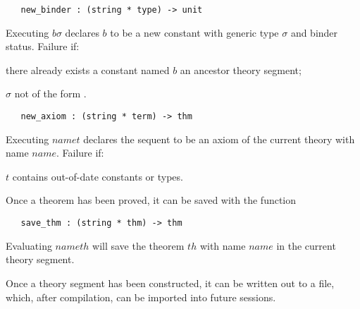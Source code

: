 \begin{boxed}
\begin{verbatim}
   new_binder : (string * type) -> unit
\end{verbatim}\end{boxed}


\noindent Executing $b$$\sigma$\ml{)}
declares $b$ to be a new constant with generic type $\sigma$ and
binder status.
Failure if:
\begin{myenumerate}
\item there already exists a constant named $b$ an ancestor theory segment;
\item $\sigma$ not of the form .
\end{myenumerate}

\begin{boxed}
\begin{verbatim}
   new_axiom : (string * term) -> thm
\end{verbatim}\end{boxed}


\noindent Executing $name$$t$\ml{)} declares the
sequent
 to be an axiom of the current theory with name $name$.
Failure if:
\begin{myenumerate}
\item $t$ contains out-of-date constants or types.
\end{myenumerate}


Once a theorem has been proved, it can be saved with the function

\begin{boxed}
\begin{verbatim}
   save_thm : (string * thm) -> thm
\end{verbatim}\end{boxed}

\noindent Evaluating $name$$th$\ml{)} will save
the theorem $th$ with name $name$ in the current theory
segment.

Once a theory segment has been constructed, it can be written out to a
file, which, after compilation, can be imported into future sessions.

